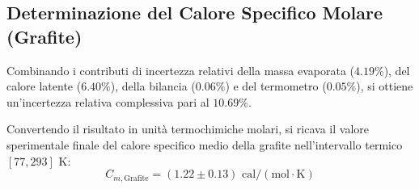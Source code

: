 \documentclass[a4paper,12pt]{article}
\begin{document}
\subsection{Determinazione del Calore Specifico Molare (Grafite)}
Combinando i contributi di incertezza relativi della massa evaporata ($4.19\%$), del calore latente ($6.40\%$), della bilancia ($0.06\%$) e del termometro ($0.05\%$), si ottiene un'incertezza relativa complessiva pari al $10.69\%$. 

Convertendo il risultato in unità termochimiche molari, si ricava il valore sperimentale finale del calore specifico medio della grafite nell'intervallo termico $[77, 293]\text{ K}$:
\begin{equation*}
    C_{m, \text{Grafite}} = (1.22 \pm 0.13)\text{ cal}/(\text{mol}\cdot\text{K})
\end{equation*}
\end{document}
